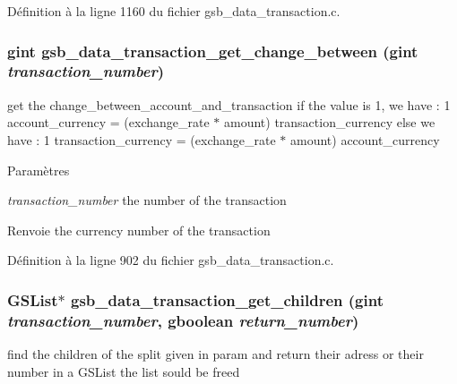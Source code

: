 Définition à la ligne 1160 du fichier gsb\_\-data\_\-transaction.c.

\subsubsection[{gsb\_\-data\_\-transaction\_\-get\_\-change\_\-between}]{\setlength{\rightskip}{0pt plus 5cm}gint gsb\_\-data\_\-transaction\_\-get\_\-change\_\-between (gint {\em transaction\_\-number})}\label{gsb__data__transaction_8h_afd1af457967cb31d2c7396bc1f19adf7}
get the change\_\-between\_\-account\_\-and\_\-transaction if the value is 1, we have : 1 account\_\-currency = (exchange\_\-rate $\ast$ amount) transaction\_\-currency else we have : 1 transaction\_\-currency = (exchange\_\-rate $\ast$ amount) account\_\-currency


\begin{DoxyParams}{Paramètres}
\item[{\em transaction\_\-number}]the number of the transaction\end{DoxyParams}
\begin{DoxyReturn}{Renvoie}
the currency number of the transaction 
\end{DoxyReturn}


Définition à la ligne 902 du fichier gsb\_\-data\_\-transaction.c.

\subsubsection[{gsb\_\-data\_\-transaction\_\-get\_\-children}]{\setlength{\rightskip}{0pt plus 5cm}GSList$\ast$ gsb\_\-data\_\-transaction\_\-get\_\-children (gint {\em transaction\_\-number}, \/  gboolean {\em return\_\-number})}\label{gsb__data__transaction_8h_a7694ce23370b2f50ab250c3162aaa0b3}
find the children of the split given in param and return their adress or their number in a GSList the list sould be freed


